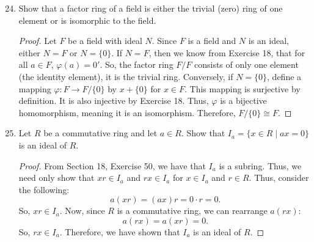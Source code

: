 \documentclass[12pt, oneside]{book}
\newcommand{\pf}[1]{
    \begin{customframedproof}[linecolor=orangehdx!75]
        \begin{proof}
        #1
        \end{proof}
    \end{customframedproof}
}
\begin{document}
\begin{enumerate}
    \setcounter{enumi}{23}   
    \item Show that a factor ring of a field is either the trivial (zero) ring of one element or is isomorphic to the field. 
    \pf{
        Let \(F\) be a field with ideal \(N\). Since \(F\) is a field and \(N\) is an ideal, either \(N = F\) or \(N = \{0\}\). If \(N = F\), then we know from Exercise 18, that for all \(a \in F\), \(\varphi(a) = 0'\). So, the factor ring \(F/F\) consists of only one element (the identity element), it is the trivial ring. Conversely, if \(N = \{0\}\), define a mapping \(\varphi : F \to F/\{0\}\) by \(x + \{0\}\) for \(x \in F\). This mapping is surjective by definition. It is also injective by Exercise 18. Thus, \(\varphi\) is a bijective homomorphism, meaning it is an isomorphism. Therefore, \(F/\{0\} \cong F\).
    }

        


    \setcounter{enumi}{25}   
    \item Let \(R\) be a commutative ring and let \(a \in R\). Show that \(I_{a} = \{x \in R \mid ax = 0\}\) is an ideal of \(R\). 
    \pf{
        From Section 18, Exercise 50, we have that \(I_{a}\) is a subring. Thus, we need only show that \(xr \in I_a\) and \(rx \in I_a\) for \(x \in I_a\) and \(r \in R\). Thus, consider the following:
        \[
            a(xr) = (ax)r = 0 \cdot r = 0.
        \]
        So, \(xr \in I_{a}\). Now, since \(R\) is a commutative ring, we can rearrange \(a(rx)\):
        \[
            a(rx) = a(xr) = 0.
        \]
        So, \(rx \in I_{a}\). Therefore, we have shown that \(I_{a}\) is an ideal of \(R\).
    }
\newpage


\end{enumerate}
\end{document}

